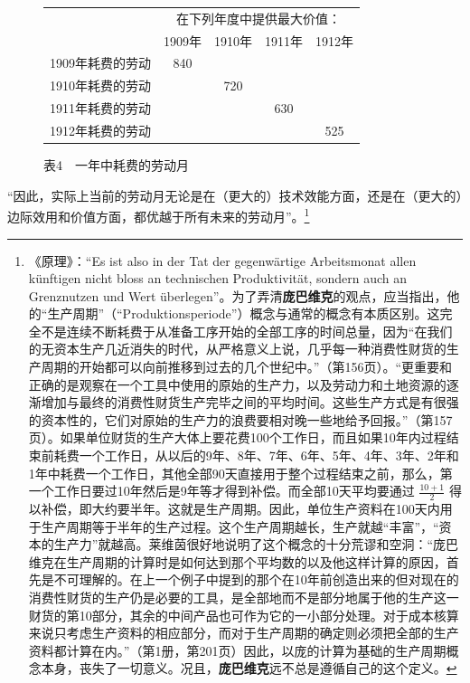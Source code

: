 \documentclass[fontset=fandol, a4paper, 12pt, openright]{ctexbook}
\begin{document}
\begin{figure}[htbp]
    \centering
    \begin{tabular}{c | c c c c}
        \hline
        & \multicolumn{4}{c}{在下列年度中提供最大价值：} \\
        & 1909年 & 1910年 & 1911年 & 1912年 \\
        \hline
        1909年耗费的劳动 & 840 & & & \\
        1910年耗费的劳动 & & 720 & & \\
        1911年耗费的劳动 & & & 630 & \\
        1912年耗费的劳动 & & & & 525 \\
        \hline
    \end{tabular}
    \caption{表4　一年中耗费的劳动月}
\end{figure}

“因此，实际上当前的劳动月无论是在（更大的）技术效能方面，还是在（更大的）边际效用和价值方面，都优越于所有未来的劳动月”。\footnote{《原理》：“Es ist also in der Tat der gegenw\"{a}rtige Arbeitsmonat allen k\"{u}nftigen nicht bloss an technischen Produktivit\"{a}t, sondern auch an Grenznutzen und Wert \"{u}berlegen”。为了弄清\textbf{庞巴维克}的观点，应当指出，他的“生产周期”（“Produktionsperiode”）概念与通常的概念有本质区别。这完全不是连续不断耗费于从准备工序开始的全部工序的时间总量，因为“在我们的无资本生产几近消失的时代，从严格意义上说，几乎每一种消费性财货的生产周期的开始都可以向前推移到过去的几个世纪中。”（第156页）。“更重要和正确的是观察在一个工具中使用的原始的生产力，以及劳动力和土地资源的逐渐增加与最终的消费性财货生产完毕之间的平均时间。这些生产方式是有很强的资本性的，它们对原始的生产力的浪费要相对晚一些地给予回报。”（第157页）。如果单位财货的生产大体上要花费100个工作日，而且如果10年内过程结束前耗费一个工作日，从以后的9年、8年、7年、6年、5年、4年、3年、2年和1年中耗费一个工作日，其他全部90天直接用于整个过程结束之前，那么，第一个工作日要过10年然后是9年等才得到补偿。而全部10天平均要通过 $\frac{10+1}{2}$ 得以补偿，即大约要半年。这就是生产周期。因此，单位生产资料在100天内用于生产周期等于半年的生产过程。这个生产周期越长，生产就越“丰富”，“资本的生产力”就越高。莱维茵很好地说明了这个概念的十分荒谬和空洞：“庞巴维克在生产周期的计算时是如何达到那个平均数的以及他这样计算的原因，首先是不可理解的。在上一个例子中提到的那个在10年前创造出来的但对现在的消费性财货的生产仍是必要的工具，是全部地而不是部分地属于他的生产这一财货的第10部分，其余的中间产品也可作为它的一小部分处理。对于成本核算来说只考虑生产资料的相应部分，而对于生产周期的确定则必须把全部的生产资料都计算在内。”（第1册，第201页）因此，以庞的计算为基础的生产周期概念本身，丧失了一切意义。况且，\textbf{庞巴维克}远不总是遵循自己的这个定义。}
\end{document}

